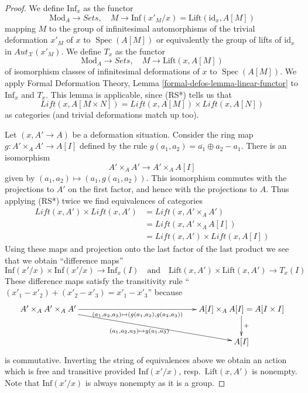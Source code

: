 \documentclass{stacks-project}
\theoremstyle{plain}
\theoremstyle{definition}
\theoremstyle{remark}
\numberwithin{equation}{subsection}
\def\Spec{\mathop{\mathrm{Spec}}}
\begin{document}
\begin{proof}
We define $\text{Inf}_x$ as the functor
$$
\text{Mod}_A \longrightarrow \textit{Sets},\quad
M \longrightarrow
\text{Inf}(x'_M/x) = \text{Lift}(\text{id}_x, A[M])
$$
mapping $M$ to the group of infinitesimal automorphisms
of the trivial deformation $x'_M$ of $x$ to $\Spec(A[M])$
or equivalently the group of lifts of $\text{id}_x$ in
$\mathit{Aut}_\mathcal{X}(x'_M)$.
We define $T_x$ as the functor
$$
\text{Mod}_A \longrightarrow \textit{Sets},\quad
M \longrightarrow \text{Lift}(x, A[M])
$$
of isomorphism classes of infinitesimal deformations of $x$ to
$\Spec(A[M])$. We apply Formal Deformation Theory, Lemma
\ref{formal-defos-lemma-linear-functor}
to $\text{Inf}_x$ and $T_x$. This lemma is applicable, since
(RS*) tells us that
$$
\textit{Lift}(x, A[M \times N]) =
\textit{Lift}(x, A[M]) \times \textit{Lift}(x, A[N])
$$
as categories (and trivial deformations match up too).

\medskip\noindent
Let $(x, A' \to A)$ be a deformation situation. Consider the ring map
$g : A' \times_A A' \to A[I]$ defined by the
rule $g(a_1, a_2) = \overline{a_1} \oplus a_2 - a_1$.
There is an isomorphism
$$
A' \times_A A' \longrightarrow A' \times_A A[I]
$$
given by $(a_1, a_2) \mapsto (a_1, g(a_1, a_2))$.
This isomorphism commutes with the projections to $A'$ on the first
factor, and hence with the projections to $A$. Thus applying (RS*)
twice we find equivalences of categories
\begin{align*}
\textit{Lift}(x, A') \times \textit{Lift}(x, A')
& =
\textit{Lift}(x, A' \times_A A') \\
& =
\textit{Lift}(x, A' \times_A A[I]) \\
& =
\textit{Lift}(x, A') \times \textit{Lift}(x, A[I])
\end{align*}
Using these maps and projection onto the last factor of the last product
we see that we obtain ``difference maps''
$$
\text{Inf}(x'/x) \times  \text{Inf}(x'/x)
\longrightarrow
\text{Inf}_x(I)
\quad\text{and}\quad
\text{Lift}(x, A') \times \text{Lift}(x, A')
\longrightarrow
T_x(I)
$$
These difference maps satisfy the transitivity rule
``$(x'_1 - x'_2) + (x'_2 - x'_3) = x'_1 - x'_3$'' because
$$
\xymatrix{
A' \times_A A' \times_A A'
\ar[rrrrr]_-{(a_1, a_2, a_3) \mapsto (g(a_1, a_2), g(a_2, a_3))}
\ar[rrrrrd]_{(a_1, a_2, a_3) \mapsto g(a_1, a_3)} & & & & &
A[I] \times_A A[I] = A[I \times I] \ar[d]^{+} \\
& & & & & A[I]
}
$$
is commutative. Inverting the string of equivalences above we obtain
an action which is free and transitive provided $\text{Inf}(x'/x)$,
resp.\ $\text{Lift}(x, A')$ is nonempty. Note that $\text{Inf}(x'/x)$
is always nonempty as it is a group.
\end{proof}
\end{document}
